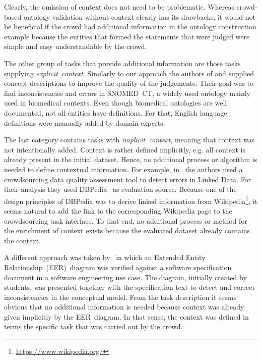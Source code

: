 Clearly, the omission of context does not need to be problematic. Whereas crowd-based ontology validation without context clearly has its drawbacks, it would not be beneficial if the crowd had additional information in the ontology construction example because the entities that formed the statements that were judged were simple and easy understandable by the crowd. 

The other group of tasks that provide additional information are those tasks supplying \emph{explicit~context}. Similarly to our approach the authors of \cite{mortensen2015} and \cite{mortensen2016} supplied concept descriptions to improve the quality of the judgements. Their goal was to find inconsistencies and errors in SNOMED~CT, a widely used ontology mainly used in biomedical contexts. Even though biomedical ontologies are well documented, not all entities have definitions. For that, English language definitions were manually added by domain experts. 

The last category contains tasks with \emph{implicit~context}, meaning that context was not intentionally added. Context is rather defined implicitly, e.g. all context is already present in the initial dataset. Hence, no additional process or algorithm is needed to define contextual information. For example, in~\cite{acosta2018} the authors used a crowdsourcing data quality assessment tool to detect errors in Linked Data. 
For their analysis they used DBPedia~\cite{auer2007} as evaluation source. Because one of the design principles of DBPedia was to derive linked information from Wikipedia\footnote{\url{https://www.wikipedia.org/}}, it seems natural to add the link to the corresponding Wikipedia page to the crowdsourcing task interface. To that end, no additional process or method for the enrichment of context exists because the evaluated dataset already contains the context.

A different approach was taken by~\cite{sabou2018, winkler2017, winkler2017_2} in which an Extended Entity Relationship~(EER)~diagram was verified against a software specification document in a software engineering use case. The diagram, initially created by students, was presented together with the specification text to detect and correct inconsistencies in the conceptual model. From the task description it seems obvious that no additional information is needed because context was already given implicitly by the EER~diagram. In that sense, the context was defined in terms the specific task that was carried out by the crowd. 

